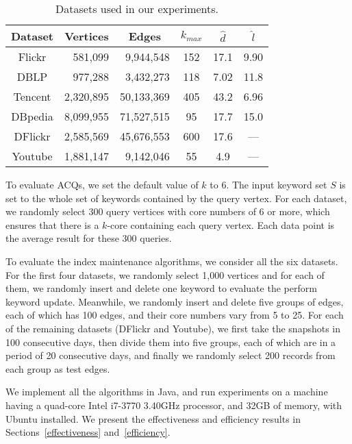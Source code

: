 \begin{table}[h]
  \centering
  \small
  \footnotesize \caption {Datasets used in our experiments.}\label{tab:dataset}
  \begin{tabular}{c|r|r|c|c|c}
     \hline
          {\bf Dataset}  & \multicolumn{1}{c|}{\textbf{Vertices}}
                         & \multicolumn{1}{c|}{\textbf{Edges}}
                         & $k_{max}$
                         & \textbf{\emph{{$\widehat d$}}}
                         & \textbf{\emph{{$\widehat l$}}}\\
     \hline\hline
          Flickr         &  581,099      &  9,944,548   &   152   & 17.1   &  9.90 \\
     \hline
          DBLP           &  977,288      &  3,432,273   &   118   &  7.02  &  11.8 \\
     \hline
          Tencent        &  2,320,895    &  50,133,369  &   405   &  43.2  &  6.96 \\
     \hline
          DBpedia        &  8,099,955    &  71,527,515  &    95   &  17.7  &  15.0 \\
     \hline
          DFlickr        &  2,585,569    &  45,676,553  &   600   &  17.6  &  --- \\
     \hline
          Youtube        &  1,881,147    &  9,142,046   &   55   &  4.9  &  --- \\
     \hline
  \end{tabular}
\end{table}

{\color{blue}
To evaluate ACQs, we set the default value of $k$ to 6. The input keyword set $S$ is set to the whole set of keywords contained by the query vertex. For each dataset, we randomly select 300 query vertices with core numbers of 6 or more, which ensures that there is a $k$-core containing each query vertex.
Each data point is the average result for these 300 queries.

To evaluate the index maintenance algorithms, we consider all the six datasets.
For the first four datasets, we randomly select 1,000 vertices and for each of them, we randomly insert and delete one keyword to evaluate the perform keyword update. Meanwhile, we randomly insert and delete five groups of edges, each of which has 100 edges, and their core numbers vary from 5 to 25.
For each of the remaining datasets (DFlickr and Youtube), we first take the snapshots in 100 consecutive days, then divide them into five groups, each of which are in a period of 20 consecutive days, and finally we randomly select 200 records from each group as test edges.
}

We implement all the algorithms in Java, and run experiments on a machine having a quad-core Intel i7-3770 3.40GHz processor, and 32GB of memory, with Ubuntu installed.
We present the effectiveness and efficiency results in Sections~\ref{effectiveness} and~\ref{efficiency}.
